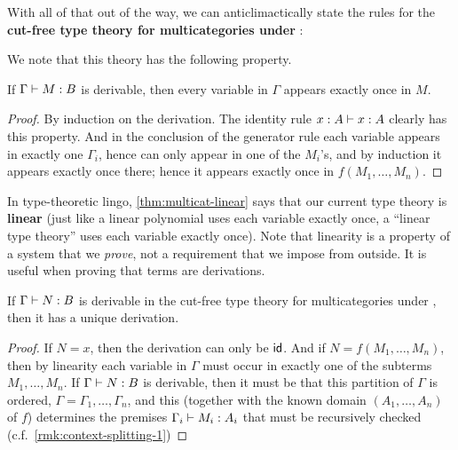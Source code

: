 With all of that out of the way, we can anticlimactically state the rules for the \textbf{cut-free type theory for multicategories under \cG}:
We note that this theory has the following property.

\begin{lem}\label{thm:multicat-linear}
  If $\Gamma\vdash M:B$ is derivable, then every variable in $\Gamma$ appears exactly once in $M$.
\end{lem}
\begin{proof}
  By induction on the derivation.
  The identity rule $x:A\vdash x:A$ clearly has this property.
  And in the conclusion of the generator rule each variable appears in exactly one $\Gamma_i$, hence can only appear in one of the $M_i$'s, and by induction it appears exactly once there; hence it appears exactly once in $f(M_1,\dots,M_n)$.
\end{proof}

In type-theoretic lingo, \cref{thm:multicat-linear} says that our current type theory is \textbf{linear} (just like a linear polynomial uses each variable exactly once, a ``linear type theory'' uses each variable exactly once).
Note that linearity is a property of a system that we \emph{prove}, not a requirement that we impose from outside.
It is useful when proving that terms are derivations.

\begin{lem}\label{thm:multicat-tad}
  If $\Gamma\vdash N:B$ is derivable in the cut-free type theory for multicategories under \cG, then it has a unique derivation.
\end{lem}
\begin{proof}
  If $N=x$, then the derivation can only be $\mathsf{id}$.
  And if $N=f(M_1,\dots,M_n)$, then by linearity each variable in $\Gamma$ must occur in exactly one of the subterms $M_1,\dots,M_n$.
  If $\Gamma\vdash N:B$ is derivable, then it must be that this partition of $\Gamma$ is ordered, $\Gamma=\Gamma_1,\dots,\Gamma_n$, and this (together with the known domain $(A_1,\dots,A_n)$ of $f$) determines the premises $\Gamma_i \vdash M_i:A_i$ that must be recursively checked (c.f.\ \cref{rmk:context-splitting-1})
\end{proof}

